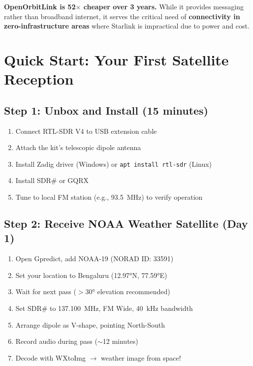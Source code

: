 \documentclass[12pt,a4paper]{article}
\begin{document}
\vspace{0.5cm}
\textbf{OpenOrbitLink is 52$\times$ cheaper over 3 years.} While it provides messaging 
rather than broadband internet, it serves the critical need of \textbf{connectivity in 
zero-infrastructure areas} where Starlink is impractical due to power and cost.

\section{Quick Start: Your First Satellite Reception}

\subsection{Step 1: Unbox and Install (15 minutes)}
\begin{enumerate}
    \item Connect RTL-SDR V4 to USB extension cable
    \item Attach the kit's telescopic dipole antenna
    \item Install Zadig driver (Windows) or \texttt{apt install rtl-sdr} (Linux)
    \item Install SDR\# or GQRX
    \item Tune to local FM station (e.g., 93.5~MHz) to verify operation
\end{enumerate}

\subsection{Step 2: Receive NOAA Weather Satellite (Day 1)}
\begin{enumerate}
    \item Open Gpredict, add NOAA-19 (NORAD ID: 33591)
    \item Set your location to Bengaluru (12.97°N, 77.59°E)
    \item Wait for next pass ($>30°$ elevation recommended)
    \item Set SDR\# to 137.100~MHz, FM Wide, 40~kHz bandwidth
    \item Arrange dipole as V-shape, pointing North-South
    \item Record audio during pass ($\sim$12 minutes)
    \item Decode with WXtoImg $\rightarrow$ weather image from space!
\end{enumerate}
\end{document}
